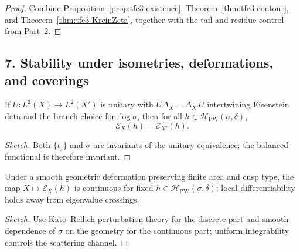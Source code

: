 \begin{proof}\relax\hspace{0pt}
Combine Proposition~\ref{prop:tfc3-existence}, Theorem~\ref{thm:tfc3-contour}, and Theorem~\ref{thm:tfc3-KreinZeta}, together with the tail and residue control from Part~2.\relax\hspace{0pt}
\end{proof}

\subsection*{7. Stability under isometries, deformations, and coverings}\relax\hspace{0pt}
\label{subsec:tfc3-stability} %

\begin{proposition}\relax\hspace{0pt}
\label{prop:tfc3-iso} %
If $U:L^2(X)\to L^2(X')$ is unitary with $U\Delta_X=\Delta_{X'}U$ intertwining Eisenstein data and the branch choice for $\log\sigma$, then for all $h\in\mathcal{H}_{\mathrm{PW}}(\sigma,\delta)$,
\[
\mathcal{E}_X(h)=\mathcal{E}_{X'}(h).
\]
\end{proposition}

\begin{proof}[Sketch]\relax\hspace{0pt}
Both $\{t_j\}$ and $\sigma$ are invariants of the unitary equivalence; the balanced functional is therefore invariant.\relax\hspace{0pt}
\end{proof}

\begin{proposition}\relax\hspace{0pt}
\label{prop:tfc3-def} %
Under a smooth geometric deformation preserving finite area and cusp type, the map $X\mapsto\mathcal{E}_X(h)$ is continuous for fixed $h\in\mathcal{H}_{\mathrm{PW}}(\sigma,\delta)$; local differentiability holds away from eigenvalue crossings.\relax\hspace{0pt}
\end{proposition}

\begin{proof}[Sketch]\relax\hspace{0pt}
Use Kato--Rellich perturbation theory for the discrete part and smooth dependence of $\sigma$ on the geometry for the continuous part; uniform integrability controls the scattering channel.\relax\hspace{0pt}
\end{proof}


